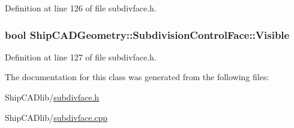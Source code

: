 Definition at line 126 of file subdivface.\-h.

\hypertarget{classShipCADGeometry_1_1SubdivisionControlFace_a49356a1146c3fc1220302deffbc20250}{
\subsubsection[{Visible}]{\setlength{\rightskip}{0pt plus 5cm}bool Ship\-C\-A\-D\-Geometry\-::\-Subdivision\-Control\-Face\-::\-Visible\hspace{0.3cm}{\ttfamily [read]}}}\label{classShipCADGeometry_1_1SubdivisionControlFace_a49356a1146c3fc1220302deffbc20250}


Definition at line 127 of file subdivface.\-h.



The documentation for this class was generated from the following files\-:\begin{DoxyCompactItemize}
\item 
Ship\-C\-A\-Dlib/\hyperlink{subdivface_8h}{subdivface.\-h}\item 
Ship\-C\-A\-Dlib/\hyperlink{subdivface_8cpp}{subdivface.\-cpp}\end{DoxyCompactItemize}
